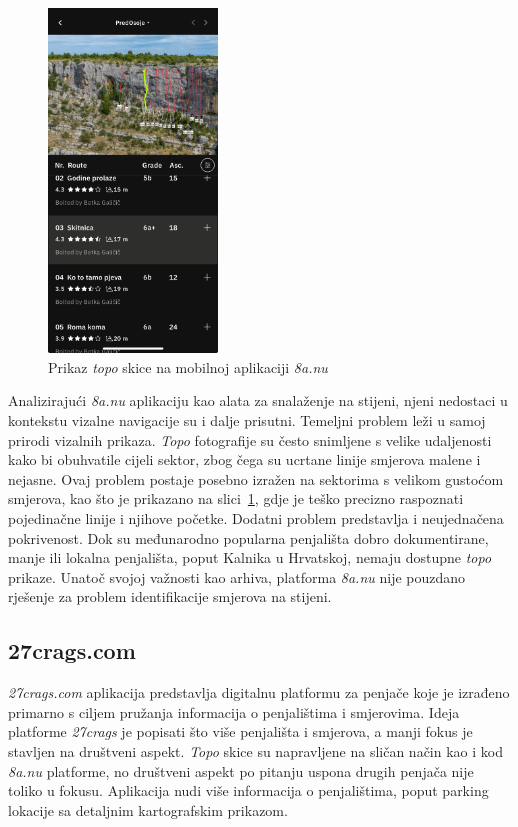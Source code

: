 \begin{figure}[H]
    \centering
    \includegraphics[width=0.4\textwidth]{images/analiza/8anu_mobile.jpg}
    \caption{Prikaz \textit{topo} skice na mobilnoj aplikaciji \textit{8a.nu}}
    \label{fig:8anu_mobile}
\end{figure}


Analizirajući \textit{8a.nu} aplikaciju kao alata za snalaženje na stijeni, njeni nedostaci u kontekstu vizalne navigacije su i dalje prisutni. Temeljni problem leži u samoj prirodi vizalnih prikaza. \textit{Topo} fotografije su često snimljene s velike udaljenosti kako bi obuhvatile cijeli sektor, zbog čega su ucrtane linije smjerova malene i nejasne. Ovaj problem postaje posebno izražen na sektorima s velikom gustoćom smjerova, kao što je prikazano na slici~\ref{fig:8anu_mobile}, gdje je teško precizno raspoznati pojedinačne linije i njihove početke. Dodatni problem predstavlja i neujednačena pokrivenost. Dok su međunarodno popularna penjališta dobro dokumentirane, manje ili lokalna penjališta, poput Kalnika u Hrvatskoj, nemaju dostupne \textit{topo} prikaze. Unatoč svojoj važnosti kao arhiva, platforma \textit{8a.nu} nije pouzdano rješenje za problem identifikacije smjerova na stijeni.

\subsection{27crags.com}

\textit{27crags.com} aplikacija predstavlja digitalnu platformu za penjače koje je izrađeno primarno s ciljem pružanja informacija o penjalištima i smjerovima. Ideja platforme \textit{27crags} je popisati što više penjališta i smjerova, a manji fokus je stavljen na društveni aspekt. \textit{Topo} skice su napravljene na sličan način kao i kod \textit{8a.nu} platforme, no društveni aspekt po pitanju uspona drugih penjača nije toliko u fokusu. Aplikacija nudi više informacija o penjalištima, poput parking lokacije sa detaljnim kartografskim prikazom.

